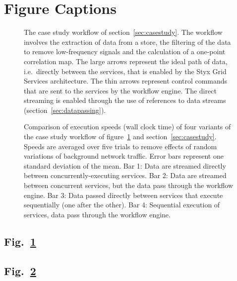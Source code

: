 \documentclass[a4paper]{article}
\begin{document}
\section*{Figure Captions}

\begin{figure}[h]
\caption{The case study workflow of section~\ref{sec:casestudy}.  The workflow involves the extraction of data from a store, the filtering of the data to remove low-frequency signals and the calculation of a one-point correlation map.  The large arrows represent the ideal path of data, i.e.\ directly between the services, that is enabled by the Styx Grid Services architecture.  The thin arrows represent control commands that are sent to the services by the workflow engine.  The direct streaming is enabled through the use of references to data streams (section~\ref{sec:datapassing}).}\label{fig:workflow}
\end{figure}

\begin{figure}[h]
\caption{Comparison of execution speeds (wall clock time) of four variants of the case study workflow of figure~\ref{fig:workflow} and section~\ref{sec:casestudy}.  Speeds are averaged over five trials to remove effects of random variations of background network traffic.  Error bars represent one standard deviation of the mean.  Bar 1: Data are streamed directly between concurrently-executing services.  Bar 2: Data are streamed between concurrent services, but the data pass through the workflow engine.  Bar 3: Data passed directly between services that execute sequentially (one after the other).  Bar 4: Sequential execution of services, data pass through the workflow engine.}\label{fig:workflowspeeds}
\end{figure}

\newpage

\subsection*{Fig.~\ref{fig:workflow}}

\newpage

\subsection*{Fig.~\ref{fig:workflowspeeds}}

\end{document}
